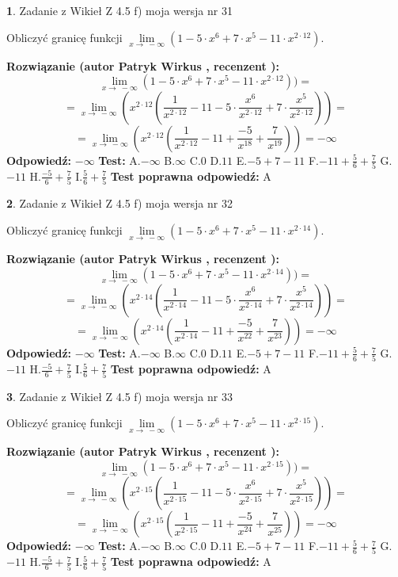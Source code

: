 \documentclass[12pt, a4paper]{article}
\theoremstyle{definition} %
\newtheorem{zad}{}
\newcommand{\zadStart}[1]{\begin{zad}#1\newline}
\newcommand{\zadStop}{\end{zad}}
\newcommand{\rozwStart}[2]{\noindent \textbf{Rozwiązanie (autor #1 , recenzent #2): }\newline}
\newcommand{\rozwStop}{\newline}
\newcommand{\odpStart}{\noindent \textbf{Odpowiedź:}\newline}
\newcommand{\odpStop}{\newline}
\newcommand{\testStart}{\noindent \textbf{Test:}\newline}
\newcommand{\testStop}{\newline}
\newcommand{\kluczStart}{\noindent \textbf{Test poprawna odpowiedź:}\newline}
\newcommand{\kluczStop}{\newline}
\begin{document}
\zadStart{Zadanie z Wikieł Z 4.5 f) moja wersja nr 31}



Obliczyć granicę funkcji  $\lim\limits_{x\to\ -\infty}(1 - 5 \cdot x^{6}+7 \cdot x^{5}- 11 \cdot x^{2\cdot12})$.
\zadStop
\rozwStart{Patryk Wirkus}{}
$$\lim\limits_{x\to\ -\infty}(1 - 5 \cdot x^{6}+7 \cdot x^{5}- 11 \cdot x^{2\cdot12}))=$$
$$=\lim\limits_{x\to\ -\infty}(x^{2\cdot12}(\frac{1}{x^{2\cdot12}}-11 -5 \cdot \frac{x^{6}}{x^{2\cdot12}}+7 \cdot \frac{x^{5}}{x^{2\cdot12}}))=$$
$$=\lim\limits_{x\to\ -\infty}(x^{2\cdot12}(\frac{1}{x^{2\cdot12}}-11 + \frac{-5}{x^{18}}+ \frac{7}{x^{19}}))=-\infty$$
\rozwStop
\odpStart
$-\infty$
\odpStop
\testStart
A.$-\infty$ B.$\infty$ C.$0$ D.$11$ E.$-5 + 7 - 11$
F.$-11+\frac{5}{6}+\frac{7}{5}$ G.$-11$
H.$\frac{-5}{6}+\frac{7}{5}$
I.$\frac{5}{6}+\frac{7}{5}$
\testStop
\kluczStart
A
\kluczStop



\zadStart{Zadanie z Wikieł Z 4.5 f) moja wersja nr 32}



Obliczyć granicę funkcji  $\lim\limits_{x\to\ -\infty}(1 - 5 \cdot x^{6}+7 \cdot x^{5}- 11 \cdot x^{2\cdot14})$.
\zadStop
\rozwStart{Patryk Wirkus}{}
$$\lim\limits_{x\to\ -\infty}(1 - 5 \cdot x^{6}+7 \cdot x^{5}- 11 \cdot x^{2\cdot14}))=$$
$$=\lim\limits_{x\to\ -\infty}(x^{2\cdot14}(\frac{1}{x^{2\cdot14}}-11 -5 \cdot \frac{x^{6}}{x^{2\cdot14}}+7 \cdot \frac{x^{5}}{x^{2\cdot14}}))=$$
$$=\lim\limits_{x\to\ -\infty}(x^{2\cdot14}(\frac{1}{x^{2\cdot14}}-11 + \frac{-5}{x^{22}}+ \frac{7}{x^{23}}))=-\infty$$
\rozwStop
\odpStart
$-\infty$
\odpStop
\testStart
A.$-\infty$ B.$\infty$ C.$0$ D.$11$ E.$-5 + 7 - 11$
F.$-11+\frac{5}{6}+\frac{7}{5}$ G.$-11$
H.$\frac{-5}{6}+\frac{7}{5}$
I.$\frac{5}{6}+\frac{7}{5}$
\testStop
\kluczStart
A
\kluczStop



\zadStart{Zadanie z Wikieł Z 4.5 f) moja wersja nr 33}



Obliczyć granicę funkcji  $\lim\limits_{x\to\ -\infty}(1 - 5 \cdot x^{6}+7 \cdot x^{5}- 11 \cdot x^{2\cdot15})$.
\zadStop
\rozwStart{Patryk Wirkus}{}
$$\lim\limits_{x\to\ -\infty}(1 - 5 \cdot x^{6}+7 \cdot x^{5}- 11 \cdot x^{2\cdot15}))=$$
$$=\lim\limits_{x\to\ -\infty}(x^{2\cdot15}(\frac{1}{x^{2\cdot15}}-11 -5 \cdot \frac{x^{6}}{x^{2\cdot15}}+7 \cdot \frac{x^{5}}{x^{2\cdot15}}))=$$
$$=\lim\limits_{x\to\ -\infty}(x^{2\cdot15}(\frac{1}{x^{2\cdot15}}-11 + \frac{-5}{x^{24}}+ \frac{7}{x^{25}}))=-\infty$$
\rozwStop
\odpStart
$-\infty$
\odpStop
\testStart
A.$-\infty$ B.$\infty$ C.$0$ D.$11$ E.$-5 + 7 - 11$
F.$-11+\frac{5}{6}+\frac{7}{5}$ G.$-11$
H.$\frac{-5}{6}+\frac{7}{5}$
I.$\frac{5}{6}+\frac{7}{5}$
\testStop
\kluczStart
A
\kluczStop
\end{document}
